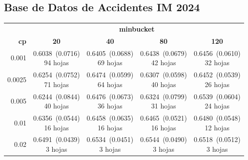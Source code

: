 \documentclass[twoside,a4paper,12pt,onecolumn,openany]{book}
\begin{document}
\vspace{0.1cm}
 
\subsection*{Base de Datos de Accidentes IM 2024}
 
\begin{table}[H]
\centering
\small
\setlength{\tabcolsep}{4pt}
\begin{tabular}{r|cccc}
\toprule
 & \multicolumn{4}{c}{\textbf{minbucket}} \\
\cmidrule(lr){2-5}
\textbf{cp} & \textbf{20} & \textbf{40} & \textbf{80} & \textbf{120} \\
\midrule
0.001 & \shortstack{0.6038~(0.0716)\\ 94 hojas} & \shortstack{0.6405~(0.0688)\\ 69 hojas} & \shortstack{0.6438~(0.0679)\\ 42 hojas} & \shortstack{0.6456~(0.0610)\\ 32 hojas} \\[4pt]
0.0025 & \shortstack{0.6254~(0.0752)\\ 71 hojas} & \shortstack{0.6474~(0.0599)\\ 64 hojas} & \shortstack{0.6307~(0.0598)\\ 40 hojas} & \shortstack{0.6452~(0.0539)\\ 26 hojas} \\[4pt]
0.005 & \shortstack{0.6244~(0.0844)\\ 40 hojas} & \shortstack{0.6476~(0.0673)\\ 36 hojas} & \shortstack{0.6324~(0.0799)\\ 31 hojas} & \shortstack{0.6539~(0.0604)\\ 24 hojas} \\[4pt]
0.01 & \shortstack{0.6356~(0.0544)\\ 16 hojas} & \shortstack{0.6458~(0.0635)\\ 16 hojas} & \shortstack{0.6465~(0.0521)\\ 16 hojas} & \shortstack{0.6480~(0.0548)\\ 12 hojas} \\[4pt]
0.02 & \shortstack{0.6491~(0.0439)\\ 3 hojas} & \shortstack{0.6534~(0.0451)\\ 3 hojas} & \shortstack{0.6544~(0.0490)\\ 3 hojas} & \shortstack{0.6518~(0.0512)\\ 3 hojas} \\[4pt]

\end{tabular}
\end{table}
\end{document}
